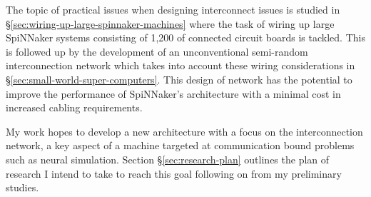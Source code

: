 		The topic of practical issues when designing interconnect issues is studied
		in \S\ref{sec:wiring-up-large-spinnaker-machines} where the task of wiring
		up large SpiNNaker systems consisting of 1,200 of connected circuit boards
		is tackled. This is followed up by the development of an unconventional
		semi-random interconnection network which takes into account these wiring
		considerations in \S\ref{sec:small-world-super-computers}. This design of
		network has the potential to improve the performance of SpiNNaker's
		architecture with a minimal cost in increased cabling requirements.
	
	
		My work hopes to develop a new architecture with a focus on the
		interconnection network, a key aspect of a machine targeted at communication
		bound problems such as neural simulation. Section \S\ref{sec:research-plan}
		outlines the plan of research I intend to take to reach this goal following
		on from my preliminary studies.
